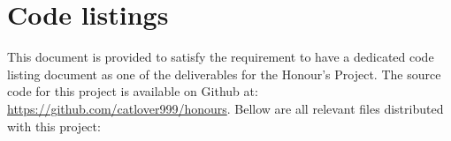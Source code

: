 \chapter{Code listings}
This document is provided to satisfy the requirement to have a dedicated code listing document as one of the deliverables for the Honour's Project. The source code for this project is available on Github at: \url{https://github.com/catlover999/honours}. Bellow are all relevant files distributed with this project:








